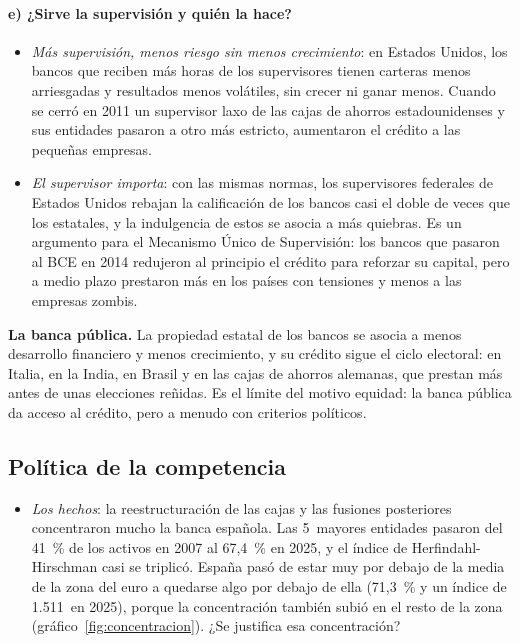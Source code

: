 \documentclass[11pt]{article}
\begin{document}
\paragraph{e) ¿Sirve la supervisión y quién la hace?}

\begin{itemize}
\item \emph{Más supervisión, menos riesgo sin menos crecimiento}: en Estados Unidos, los bancos que reciben más horas de los supervisores tienen carteras menos arriesgadas y resultados menos volátiles, sin crecer ni ganar menos\nocite{HirtleKovnerPlosser2020}. Cuando se cerró en 2011 un supervisor laxo de las cajas de ahorros estadounidenses y sus entidades pasaron a otro más estricto, aumentaron el crédito a las pequeñas empresas\nocite{GranjaLeuz2024}.
\item \emph{El supervisor importa}: con las mismas normas, los supervisores federales de Estados Unidos rebajan la calificación de los bancos casi el doble de veces que los estatales, y la indulgencia de estos se asocia a más quiebras\nocite{AgarwalLuccaSeruTrebbi2014}. Es un argumento para el Mecanismo Único de Supervisión: los bancos que pasaron al BCE en 2014 redujeron al principio el crédito para reforzar su capital\nocite{FiordelisiRicciStentellaLopes2017}, pero a medio plazo prestaron más en los países con tensiones y menos a las empresas zombis\nocite{AltavillaEtAl2026Supervision}.
\end{itemize}

\begin{anotaciones}
\textbf{La banca pública.} La propiedad estatal de los bancos se asocia a menos desarrollo financiero y menos crecimiento\nocite{LaPortaLopezShleifer2002}, y su crédito sigue el ciclo electoral: en Italia\nocite{Sapienza2004}, en la India\nocite{Cole2009}, en Brasil\nocite{Carvalho2014} y en las cajas de ahorros alemanas, que prestan más antes de unas elecciones reñidas\nocite{EnglmaierStowasser2017}. Es el límite del motivo equidad: la banca pública da acceso al crédito, pero a menudo con criterios políticos.
\end{anotaciones}

\subsection{Política de la competencia}\label{sec:competencia}

\begin{itemize}
\item \emph{Los hechos}: la reestructuración de las cajas y las fusiones posteriores concentraron mucho la banca española. Las 5~mayores entidades pasaron del 41~\% de los activos en 2007 al 67,4~\% en 2025, y el índice de Herfindahl-Hirschman casi se triplicó. España pasó de estar muy por debajo de la media de la zona del euro a quedarse algo por debajo de ella (71,3~\% y un índice de 1.511~en 2025), porque la concentración también subió en el resto de la zona (gráfico~\ref{fig:concentracion})\nocite{ECB2025SSI,ECB2026SSIZonaEuro,BCE2026NotaSSI}. ¿Se justifica esa concentración?
\end{itemize}
\end{document}

